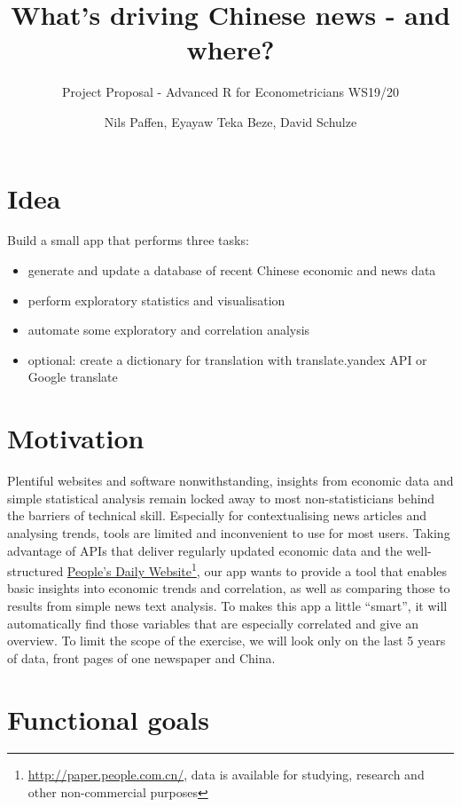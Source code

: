 \documentclass[11pt]{scrarticle} %
\title{What's driving Chinese news - and where?}
\subtitle{Project Proposal - Advanced R for Econometricians WS19/20}
\author{Nils Paffen, Eyayaw Teka Beze, David Schulze}
\begin{document}
\maketitle

\section{Idea}

Build a small app that performs three tasks:

\begin{itemize}
\item generate and update a database of recent Chinese economic and news data
\item perform exploratory statistics and visualisation
\item automate some exploratory and correlation analysis
\item optional: create a dictionary for translation with translate.yandex API or Google translate
\end{itemize}

\section{Motivation}

\par Plentiful websites and software nonwithstanding, insights from economic data and simple statistical analysis remain locked away to most non-statisticians behind the barriers of technical skill. Especially for contextualising news articles and analysing trends, tools are limited and inconvenient to use for most users. Taking advantage of APIs that deliver regularly updated economic data and the well-structured \href{http://paper.people.com.cn/}{People's Daily Website}\footnote{\href{http://paper.people.com.cn/}{http://paper.people.com.cn/}, data is available for studying, research and other non-commercial purposes}, our app wants to provide a tool that enables basic insights into economic trends and correlation, as well as comparing those to results from simple news text analysis. To makes this app a little ``smart'', it will automatically find those variables that are especially correlated and give an overview. To limit the scope of the exercise, we will look only on the last 5 years of data, front pages of one newspaper and China.

\section{Functional goals}
\end{document}
